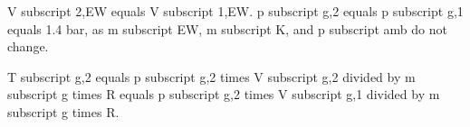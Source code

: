 V subscript 2,EW equals V subscript 1,EW.  
p subscript g,2 equals p subscript g,1 equals 1.4 bar, as m subscript EW, m subscript K, and p subscript amb do not change.  

T subscript g,2 equals p subscript g,2 times V subscript g,2 divided by m subscript g times R equals p subscript g,2 times V subscript g,1 divided by m subscript g times R.